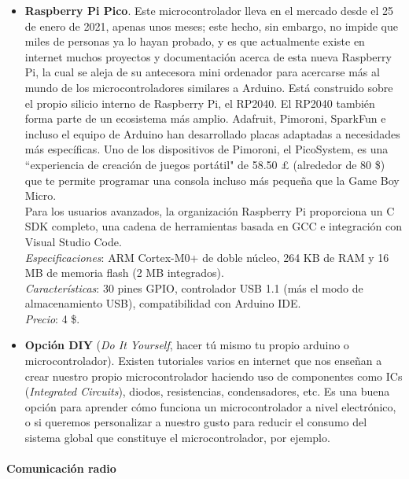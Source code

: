 \documentclass[12pt]{article}
\newcommand{\subsubsubsection}[1]{\paragraph{#1}\mbox{}\\}
\begin{document}
\begin{itemize}
		\item \textbf{Raspberry Pi Pico}. Este microcontrolador lleva en el mercado desde el 25 de enero de 2021, apenas unos meses; este hecho, sin embargo, no impide que miles de personas ya lo hayan probado, y es que actualmente existe en internet muchos proyectos y documentación acerca de esta nueva Raspberry Pi, la cual se aleja de su antecesora mini ordenador para acercarse más al mundo de los microcontroladores similares a Arduino. Está construido sobre el propio silicio interno de Raspberry Pi, el RP2040. El RP2040 también forma parte de un ecosistema más amplio. Adafruit, Pimoroni, SparkFun e incluso el equipo de Arduino han desarrollado placas adaptadas a necesidades más específicas. Uno de los dispositivos de Pimoroni, el PicoSystem, es una ``experiencia de creación de juegos portátil" de 58.50 £ (alrededor de 80 \$) que te permite programar una consola incluso más pequeña que la Game Boy Micro.\\
		
		Para los usuarios avanzados, la organización Raspberry Pi proporciona un C SDK completo, una cadena de herramientas basada en GCC e integración con Visual Studio Code. \\
		
		\textit{Especificaciones}: ARM Cortex-M0+ de doble núcleo, 264 KB de RAM y 16 MB de memoria flash (2 MB integrados). \\
		
		\textit{Características}: 30 pines GPIO, controlador USB 1.1 (más el modo de almacenamiento USB), compatibilidad con Arduino IDE.\\
		
		\textit{Precio}: 4 \$.\\
		
		\item \textbf{Opción DIY} (\textit{Do It Yourself}, hacer tú mismo tu propio arduino o microcontrolador). Existen tutoriales varios en internet que nos enseñan a crear nuestro propio microcontrolador haciendo uso de componentes como ICs (\textit{Integrated Circuits}), diodos, resistencias, condensadores, etc. Es una buena opción para aprender cómo funciona un microcontrolador a nivel electrónico, o si queremos personalizar a nuestro gusto para reducir el consumo del sistema global que constituye el microcontrolador, por ejemplo.\\

	\end{itemize}
	\subsubsubsection{Comunicación radio}
	
\end{document}
